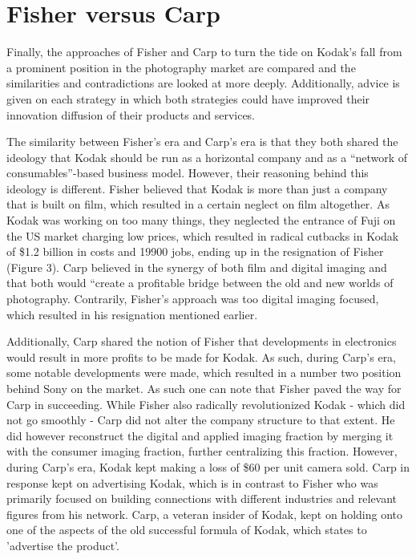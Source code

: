 \documentclass[a4paper,10pt,UTF8]{scrartcl}
\begin{document}
\section{Fisher versus Carp}

Finally, the approaches of Fisher and Carp to turn the tide on Kodak's fall from a 
prominent position in the photography market are compared and the similarities and 
contradictions are looked at more deeply. Additionally, advice is given on each 
strategy in which both strategies could have improved their innovation diffusion 
of their products and services.

The similarity between Fisher's era and Carp's era is that they both shared the 
ideology that Kodak should be run as a horizontal company and as a “network of 
consumables”-based business model. However, their reasoning behind this ideology 
is different. Fisher believed that Kodak is more than just a company that is built 
on film, which resulted in a certain neglect on film altogether. As Kodak was 
working on too many things, they neglected the entrance of Fuji on the US market 
charging low prices, which resulted in radical cutbacks in Kodak of \$1.2 billion 
in costs and 19900 jobs, ending up in the resignation of Fisher (Figure 3). 
Carp believed in the synergy of both film and digital imaging and that both 
would “create a profitable bridge between the old and new worlds of photography. 
Contrarily, Fisher's approach was too digital imaging focused, which resulted 
in his resignation mentioned earlier.

Additionally, Carp shared the notion of Fisher that developments in electronics 
would result in more profits to be made for Kodak. As such, during Carp's era, 
some notable developments were made, which resulted in a number two position 
behind Sony on the market. As such one can note that Fisher paved the way for 
Carp in succeeding. While Fisher also radically revolutionized Kodak - which 
did not go smoothly - Carp did not alter the company structure to that extent. 
He did however reconstruct the digital and applied imaging fraction by merging 
it with the consumer imaging fraction, further centralizing this fraction. 
However, during Carp's era, Kodak kept making a loss of \$60 per unit camera sold. 
Carp in response kept on advertising Kodak, which is in contrast to Fisher who was 
primarily focused on building connections with different industries and relevant 
figures from his network. Carp, a veteran insider of Kodak, kept on holding 
onto one of the aspects of the old successful formula of Kodak, which states 
to 'advertise the product'.
\end{document}

